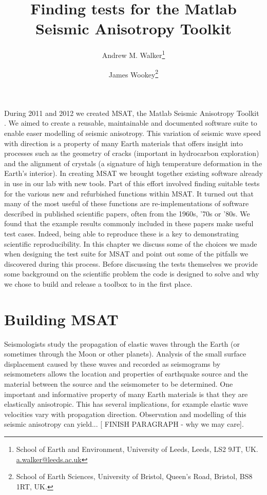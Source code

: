 \documentclass[11pt, oneside]{article}   	%
\title{Finding tests for the Matlab Seismic Anisotropy Toolkit}
\author{Andrew M. Walker\footnote{School of Earth and Environment, 
                   University of Leeds, Leeds, LS2 9JT, UK. \url{a.walker@leeds.ac.uk} }
\and 
             James Wookey\footnote{School of Earth Sciences, 
                    University of Bristol, Queen's Road, Bristol, BS8 1RT, UK.}}
\begin{document}
\maketitle
\linenumbers


During 2011 and 2012 we created MSAT, the Matlab Seismic Anisotropy
Toolkit \cite{Walker2012c}. We aimed to create a reusable, maintainable and documented
software suite to enable easer modelling of seismic anisotropy. This 
variation of seismic wave speed with direction is a property of many 
Earth materials that offers insight into processes such as the geometry
of cracks (important in hydrocarbon exploration) and the alignment
of crystals (a signature of high temperature deformation in the Earth's
interior). In creating MSAT we brought together existing software
already in use in our lab with new tools. Part of this effort involved
finding suitable tests for the various new and refurbished functions 
within MSAT. It turned out that many of the most useful of these 
functions are re-implementations of software described in published
scientific papers, often from the 1960s, '70s or '80s. We found that 
the example results commonly included in these papers make useful test
cases. Indeed, being able to reproduce these is a key to demonstrating 
scientific reproducibility. In this chapter we discuss some of the choices
we made when designing the test suite for MSAT and point out some of
the pitfalls we discovered during this process. Before discussing the 
tests themselves we provide some background on the scientific problem
the code is designed to solve and why we chose to build and release a 
toolbox to in the first place.

\section{Building MSAT}

Seismologists study the propagation of elastic waves through the Earth (or
sometimes through the Moon or other planets). Analysis of the small surface 
displacement caused by these waves and recorded as seismograms by 
seismometers allows the location and properties of earthquake source 
and the material between the source and the seismometer to be determined.
One important and informative property of many Earth materials is that they 
are elastically anisotropic. This has several implications, for example elastic 
wave velocities vary with propagation direction. Observation and modelling 
of this seismic anisotropy can yield... [ FINISH PARAGRAPH - why we may 
care].
\end{document}
